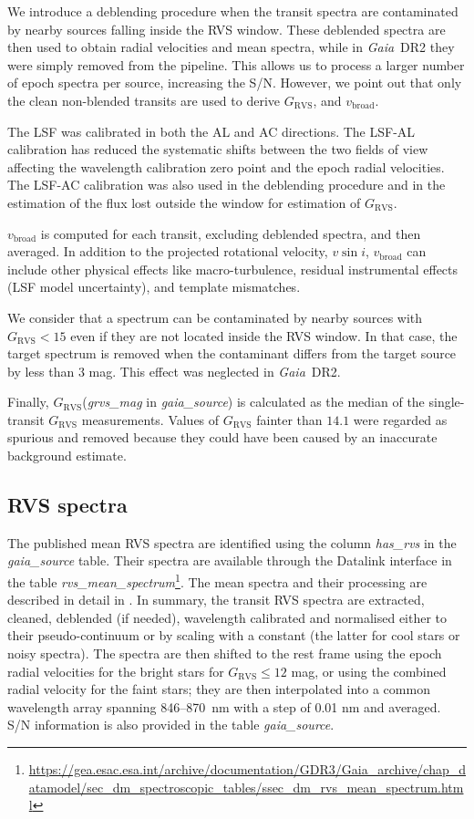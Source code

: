 \documentclass[longauth]{aa}
\makeatletter
\providecommand{\vbroad}{\ensuremath{v_\mathrm{broad}}\xspace}
\providecommand\grvs{\ensuremath{G_\mathrm{RVS}}\xspace}
\providecommand\gdrtwo{\textit{Gaia}~DR2\xspace}
\providecommand\gdrthree{\textit{Gaia}~DR3\xspace}
\providecommand{\linktodoc}{https://gea.esac.esa.int/archive/documentation/GDR3}
\providecommand{\gstable}[1]{\url{\linktodoc/Gaia_archive/chap_datamodel/sec_dm_main_source_catalogue/ssec_dm_#1.html}}%
\providecommand{\phottable}[1]{\url{\linktodoc/Gaia_archive/chap_datamodel/sec_dm_spectroscopic_tables/ssec_dm_#1.html}}%
\DeclareRobustCommand*{\fieldName}[1]{%
  \begingroup\@fieldName\scantokens{\texttt{\small {#1}}\noexpand}\endgroup}
\makeatother
\begin{document}
We introduce a deblending procedure when the transit spectra are contaminated by nearby sources falling inside the  RVS window. These deblended spectra are then used to obtain radial velocities and mean spectra,  while in \gdrtwo they were simply removed from the pipeline. This allows us to process a  larger number of epoch spectra per source, increasing the S/N.   However, we point out  that only the clean non-blended transits are used  to derive \grvs, and \vbroad. 

The LSF was calibrated in both the AL and AC  directions. The LSF-AL calibration has reduced the systematic shifts between the two fields of view affecting the wavelength calibration zero point and the epoch radial velocities. The LSF-AC calibration  was also used in the deblending procedure and in the estimation of the flux lost outside the window for estimation of \grvs. 

\vbroad is computed for each transit, excluding deblended spectra, and then averaged. In addition to the projected rotational velocity, $v\sin i$, \vbroad can include other physical effects like macro-turbulence,  residual instrumental effects (LSF model uncertainty), and template mismatches.

We consider that a spectrum can be  contaminated by nearby sources  with $\grvs<15$ even if they are not located inside the RVS window. In that case, the target spectrum is removed when the contaminant differs from the target source by less than 3 mag. This effect was neglected in \gdrtwo.

Finally, \grvs (\textit{grvs\_mag}  in \textit{gaia\_source})
is calculated as the median of the single-transit \grvs measurements. Values of \grvs fainter than $14.1$ were regarded as  spurious and removed because they could have been caused by an inaccurate background estimate.


\subsection{RVS spectra} \label{ssec:rvsSpectra}


The published mean RVS spectra  are identified using the column \textit{has\_rvs}  in the \textit{gaia\_source}
table. Their spectra are available through the Datalink interface in the table  \textit{rvs\_mean\_spectrum}\footnote{\phottable{rvs_mean_spectrum}}. The mean spectra and their processing are described in detail in \citet{DR3-DPACP-154}. In summary,  the transit RVS spectra are extracted, cleaned, deblended (if needed), wavelength calibrated and normalised either to their pseudo-continuum or by scaling with a constant (the latter for cool stars or noisy spectra). The spectra are then shifted to the rest frame using the epoch radial velocities for the bright stars for \grvs $\le 12$ mag, or using the combined radial velocity for the faint stars; they are then interpolated into a common wavelength array spanning 846--870~nm with a step of 0.01 nm and averaged. S/N information is also provided in the table \textit{gaia\_source}.
  
\end{document}
